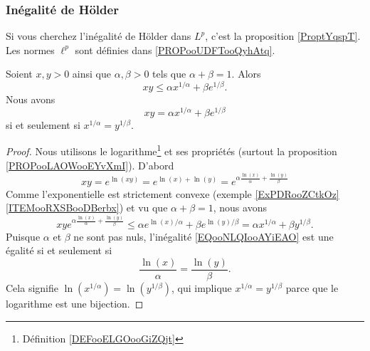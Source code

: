 \subsubsection{Inégalité de Hölder}

Si vous cherchez l'inégalité de Hölder dans \( L^p\), c'est la proposition \ref{ProptYqspT}. Les normes \(  \ell^p\) sont définies dans \ref{PROPooUDFTooQyhAtq}.

\begin{lemma}     \label{LEMooLGGDooGLGFHj}
	Soient \( x,y>0\) ainsi que \( \alpha,\beta>0\) tels que \( \alpha+\beta=1\). Alors
	\begin{equation}
		xy\leq \alpha x^{1/\alpha}+\beta e^{1/\beta}.
	\end{equation}
	Nous avons
	\begin{equation}
		xy= \alpha x^{1/\alpha}+\beta e^{1/\beta}
	\end{equation}
	si et seulement si \( x^{1/\alpha}=y^{1/\beta}\).
\end{lemma}

\begin{proof}
	Nous utilisons le logarithme\footnote{Définition \ref{DEFooELGOooGiZQjt}} et ses propriétés (surtout la proposition \ref{PROPooLAOWooEYvXmI}). D'abord
	\begin{equation}
		xy= e^{\ln(xy)}= e^{\ln(x)+\ln(y)}= e^{\alpha\frac{ \ln(x) }{ \alpha }+\frac{ \ln(y) }{ \beta }}
	\end{equation}
	Comme l'exponentielle est strictement convexe (exemple \ref{ExPDRooZCtkOz}\ref{ITEMooRXSBooDBerbx}) et vu que \( \alpha+\beta=1\), nous avons
	\begin{equation}        \label{EQooNLQIooAYiEAO}
		xy e^{\alpha\frac{ \ln(x) }{ \alpha }+\frac{ \ln(y) }{ \beta }}\leq \alpha e^{\ln(x)/\alpha}+\beta e^{\ln(y)/\beta}=\alpha x^{1/\alpha}+\beta y^{1/\beta}.
	\end{equation}
	Puisque \( \alpha\) et \( \beta\) ne sont pas nuls, l'inégalité \eqref{EQooNLQIooAYiEAO} est une égalité si et seulement si
	\begin{equation}
		\frac{ \ln(x) }{ \alpha }=\frac{ \ln(y) }{ \beta }.
	\end{equation}
	Cela signifie \( \ln(x^{1/\alpha})=\ln(y^{1/\beta})\), qui implique \( x^{1/\alpha}=y^{1/\beta}\) parce que le logarithme est une bijection.
\end{proof}

